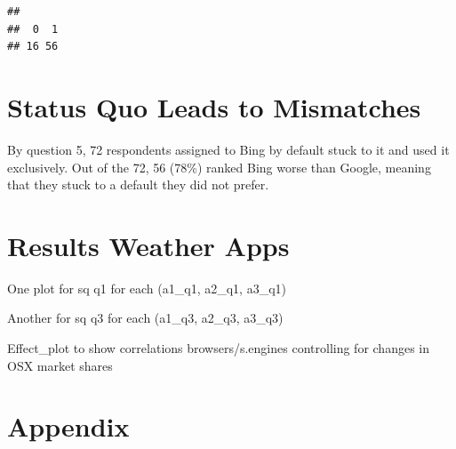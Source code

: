 \documentclass[
  11pt,
]{article}
\newenvironment{Shaded}{\begin{snugshade}}{\end{snugshade}}
\newcommand{\FunctionTok}[1]{\textcolor[rgb]{0.13,0.29,0.53}{\textbf{#1}}}
\newcommand{\NormalTok}[1]{#1}
\newcommand{\SpecialCharTok}[1]{\textcolor[rgb]{0.81,0.36,0.00}{\textbf{#1}}}
\begin{document}
\begin{Shaded}
\end{Shaded}

\begin{verbatim}
## 
##  0  1 
## 16 56
\end{verbatim}

\hypertarget{status-quo-leads-to-mismatches}{%
\section{Status Quo Leads to Mismatches}\label{status-quo-leads-to-mismatches}}

By question 5, 72 respondents assigned to Bing by default stuck to it and used it exclusively. Out of the 72, 56 (78\%) ranked Bing worse than Google, meaning that they stuck to a default they did not prefer.

\hypertarget{results-weather-apps}{%
\section{Results Weather Apps}\label{results-weather-apps}}

One plot for sq q1 for each (a1\_q1, a2\_q1, a3\_q1)

Another for sq q3 for each (a1\_q3, a2\_q3, a3\_q3)

Effect\_plot to show correlations browsers/s.engines controlling for changes in OSX market shares

\hypertarget{appendix}{%
\section{Appendix}\label{appendix}}
\end{document}

